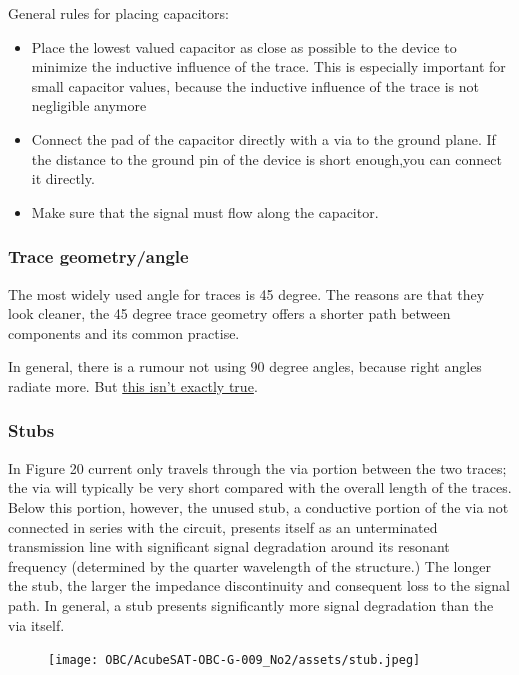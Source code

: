 \documentclass[final]{cubedoc}
\begin{document}
	General rules for placing capacitors:
	
	\begin{itemize}
		\item Place the lowest valued capacitor as close as possible to the device to minimize the inductive influence of the trace. This is especially important for small capacitor values, because the inductive influence of the trace is not negligible anymore
		\item Connect the pad of the capacitor directly with a via to the ground plane. If the distance to the ground pin of the device is short enough,you can connect it directly.
		\item Make sure that the signal must flow along the capacitor.
	\end{itemize}
	
	\subsubsection{Trace geometry/angle}
	
	The most widely used angle for traces is 45 degree. The reasons are that they look cleaner, the 45 degree trace geometry offers a shorter path between components and its common practise.
	
	In general, there is a rumour not using 90 degree angles, because right angles radiate more. But \href{https://electronics.stackexchange.com/questions/226582/pcb-90-degree-angles}{this isn't exactly true}.
	
	\subsubsection{Stubs}
	In Figure 20  current only travels through the via portion between the two traces; the via will typically be very short compared with the overall length of the traces. Below this portion, however, the unused stub, a conductive portion of the via not connected in series with the circuit, presents itself as an unterminated transmission line with significant signal degradation around its resonant frequency (determined by the quarter wavelength of the structure.) The longer the stub, the larger the impedance discontinuity and consequent loss to the signal path. In general, a stub presents significantly more signal degradation than the via itself.
	
	\begin{figure}[h!]
		\centering
		\texttt{[image: OBC/AcubeSAT-OBC-G-009\_No2/assets/stub.jpeg]}
		\caption{}
		\label{fig:my_label}
	\end{figure}
	
\end{document}
